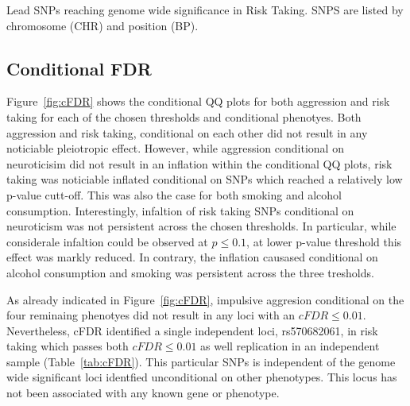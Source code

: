 \begin{table}
	\small
	\centering
	
  \caption{
    Lead SNPs reaching genome wide significance in Risk Taking.
    SNPS are listed by chromosome (CHR) and position (BP).
  }\label{tab:lead_snps_risk}
\end{table}

\subsection{Conditional FDR}
\label{sub:conditional_fdr}

Figure~\ref{fig:cFDR} shows the conditional QQ plots for both aggression and risk taking for each of the chosen thresholds and conditional phenotyes.
Both aggression and risk taking, conditional on each other did not result in any noticiable pleiotropic effect.
However, while aggression conditional on neuroticisim did not result in an inflation within the conditional QQ plots, risk taking was noticiable inflated conditional on SNPs which reached a relatively low p-value cutt-off.
This was also the case for both smoking and alcohol consumption.
Interestingly, infaltion of risk taking SNPs conditional on neuroticism was not persistent across the chosen thresholds.
In particular, while considerale infaltion could be observed at $p\leq0.1$, at lower p-value threshold this effect was markly reduced.
In contrary, the inflation causased conditional on alcohol consumption and smoking was persistent across the three tresholds.

As already indicated in Figure~\ref{fig:cFDR}, impulsive aggresion conditional on the four reminaing phenotyes did not result in any loci with an $cFDR\leq0.01$.
Nevertheless, cFDR identified a single independent loci, rs570682061, in risk taking which passes both $cFDR\leq0.01$ as well replication in an independent sample (Table~\ref{tab:cFDR}).
This particular SNPs is independent of the genome wide significant loci identfied unconditional on other phenotypes.
This locus has not been associated with any known gene or phenotype.

